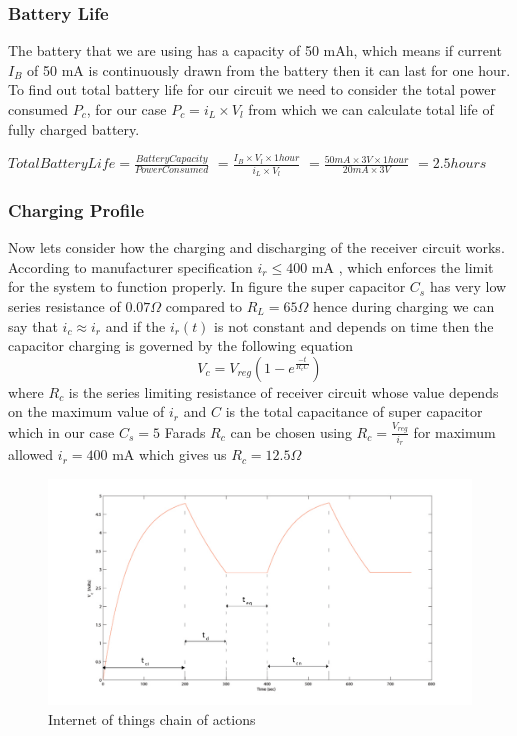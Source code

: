 \subsubsection{Battery Life}
The battery that we are using has a capacity of 50 mAh, which means if current $I_B$ of 50 mA  is continuously drawn from the battery then it can last for one hour. To find out total battery life for our circuit we need to consider the total power consumed $P_c$, for our case $P_c = i_L \times V_l $ from which we can calculate total life of fully charged battery.

 $Total Battery Life = \frac{Battery Capacity}{Power Consumed}$
                    $= \frac{I_B \times V_l \times 1 hour}{i_L \times V_l}$
                    $= \frac{50mA \times 3V \times 1 hour}{20mA \times 3V}$
                    $= 2.5 hours$


\subsubsection{Charging Profile}
Now lets consider how the charging and discharging of the receiver circuit works. According to manufacturer specification $i_r \leq 400 $ mA , which enforces the limit for the system to function properly.
In figure %
the super capacitor $C_s$ has very low series resistance of $0.07 \Omega$ compared to $R_L = 65 \Omega$ hence during charging we can say that $i_c \approx i_r$ and if the $i_r(t)$ is not constant and depends on time then the capacitor charging is governed by the following equation
\begin{equation}\label{eq:cap}
 V_c = V_{reg} \left(1 - e^{\frac{-t}{R_cC}}\right)
\end{equation}
where $R_c$ is the series limiting resistance of receiver circuit whose value depends on the maximum value of $i_r$ and $C$ is the total capacitance of super capacitor which in our case $C_s = 5 $ Farads
$R_c$ can be chosen using $R_c = \frac { V_{reg}}{i_r} $ for maximum allowed $i_r = 400$ mA which gives us $R_c = 12.5 \Omega$

\begin{figure}[h!]
\centering
\includegraphics[width=1\textwidth]{cd_cycle.pdf}
\caption{Internet of things chain of actions}
\label{fig:ch_profile}
\end{figure}



